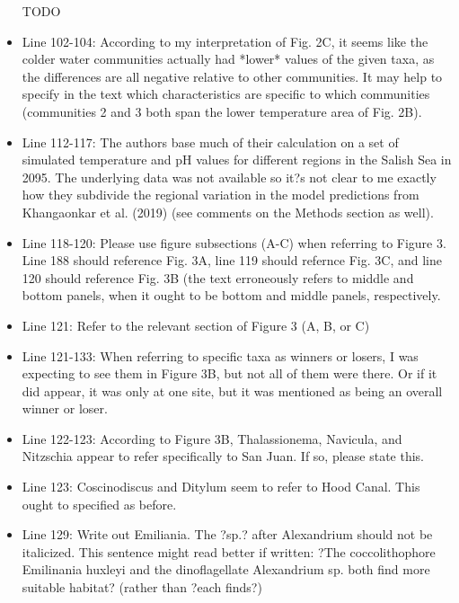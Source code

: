 \documentclass[11pt]{article}
\begin{document}
\begin{linenumbers}
\begin{itemize}
TODO 

\item{Line 102-104: According to my interpretation of Fig. 2C, it seems like the colder water communities actually had *lower* values of the given taxa, as the differences are all negative relative to other communities. It may help to specify in the text which characteristics are specific to which communities (communities 2 and 3 both span the lower temperature area of Fig. 2B).}

\item{Line 112-117: The authors base much of their calculation on a set of simulated temperature and pH values for different regions in the Salish Sea in 2095. The underlying data was not available so it?s not clear to me exactly how they subdivide the regional variation in the model predictions from Khangaonkar et al. (2019) (see comments on the Methods section as well).}

\item{Line 118-120: Please use figure subsections (A-C) when referring to Figure 3. Line 188 should reference Fig. 3A, line 119 should refernce Fig. 3C, and line 120 should reference Fig. 3B (the text erroneously refers to middle and bottom panels, when it ought to be bottom and middle panels, respectively.}

\item{Line 121: Refer to the relevant section of Figure 3 (A, B, or C)}

\item{Line 121-133: When referring to specific taxa as winners or losers, I was expecting to see them in Figure 3B, but not all of them were there. Or if it did appear, it was only at one site, but it was mentioned as being an overall winner or loser.}

\item{Line 122-123: According to Figure 3B, Thalassionema, Navicula, and Nitzschia appear to refer specifically to San Juan. If so, please state this.}

\item{Line 123: Coscinodiscus and Ditylum seem to refer to Hood Canal. This ought to specified as before.}

\item{Line 129: Write out Emiliania. The ?sp.? after Alexandrium should not be italicized. This sentence might read better if written: ?The coccolithophore Emilinania huxleyi and the dinoflagellate Alexandrium sp. both find more suitable habitat? (rather than ?each finds?)}


\end{itemize}
\end{linenumbers}
\end{document}
